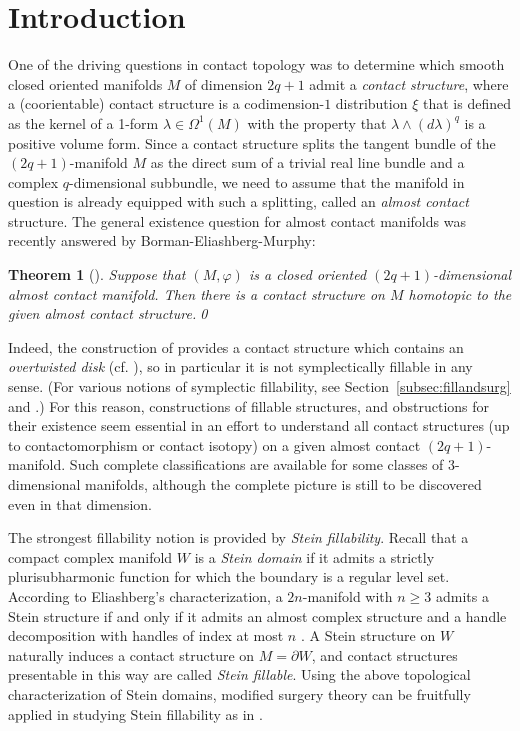 \documentclass[12pt]{amsart}
\newtheorem{Theorem}{Theorem}[section]
\theoremstyle{remark}
\begin{document}
\section{Introduction} 
\label{sec:introduction}

One of the driving questions in contact topology was to determine
which smooth closed oriented manifolds $M$ of dimension $2q{+}1$ admit a
\emph{contact structure}, where a (coorientable) contact structure is a
codimension{-}$1$ distribution $\xi$ that is defined as the kernel of a 1-form
$\lambda \in \Omega ^1 (M)$ with the property that $\lambda \wedge
(d\lambda )^q$ is a positive volume form. Since a contact structure
splits the tangent bundle of the $(2q{+}1)$-manifold $M$ as the direct sum
of a trivial real line bundle and a complex $q$-dimensional subbundle,
we need to assume that the manifold in question is already equipped
with such a splitting, called an \emph{almost contact} structure. The
general existence question for almost contact manifolds was recently answered by
Borman{-}Eliashberg-Murphy:
  
  \begin{Theorem}[\cite{BEM}]
  Suppose that $(M, \varphi )$ is a closed oriented  $(2q{+}1)$-dimensional almost 
  contact manifold. Then there is a contact structure on $M$ homotopic to the given almost contact 
  structure.\qed 
  \end{Theorem}
  
  Indeed, the construction of \cite{BEM} provides a contact structure which contains an \emph{overtwisted disk} (cf.\,\,\cite[Section~2.5]{BEM}),
  so in particular it is not symplectically fillable in any sense. (For various notions of 
  symplectic fillability, see Section~\ref{subsec:fillandsurg} and \cite{Massot12}.)
  For this reason, constructions of fillable structures, and obstructions for their existence
  seem essential in an effort to understand all contact structures (up to 
  contactomorphism or contact isotopy) on a given almost contact $(2q{+}1)$-manifold.
  Such complete classifications are available for some
  classes of 3-dimensional manifolds, although the complete picture is still to be discovered even in that dimension.
  
The strongest fillability notion is provided by \emph{Stein fillability}. 
Recall that a compact complex
manifold $W$ is a  \emph{Stein domain}
if it  admits a strictly plurisubharmonic function for which the
boundary is a regular level set. According to Eliashberg's
characterization, a $2n$-manifold with $n\geq 3$ admits a Stein
structure if and only if it admits an almost complex structure and a
handle decomposition with handles of index at most $n$ 
\cite{Cieliebak&Eliashberg12, Eliashberg??}. A Stein
structure on $W$ naturally induces a contact structure on $M=\partial
W$, and contact structures presentable in this way are called
\emph{Stein fillable}. 
Using the above topological characterization of Stein domains, 
modified surgery theory can be fruitfully applied in studying Stein fillability as in \cite{BCS2}. 
\end{document}
